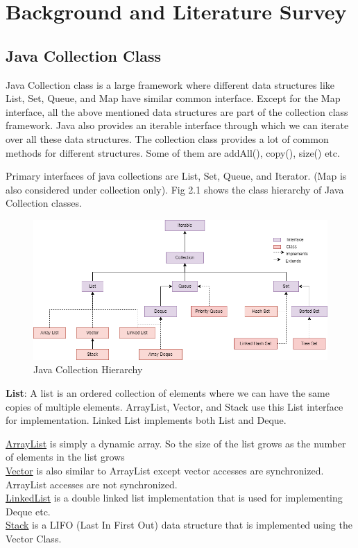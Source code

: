 \chapter{Background and Literature Survey}

\section{Java Collection Class}
Java Collection class is a large framework where different data structures like List, Set, Queue, and Map have similar common interface. Except for the Map interface, all the above mentioned data structures are part of the collection class framework. Java also provides an iterable interface through which we can iterate over all these data structures. The collection class provides a lot of common methods for different structures. Some of them are addAll(), copy(), size() etc.


Primary interfaces of java collections are List, Set, Queue, and Iterator. (Map is also considered under collection only). Fig 2.1 shows the class hierarchy of Java Collection classes.

\begin{figure} [h]
    \centering
    \includegraphics[width = \textwidth]{images/Collections.png}
    \caption{Java Collection Hierarchy}
    \label{fig:my_label}
\end{figure}

\textbf{List}: A list is an ordered collection of elements where we can have the same copies of multiple elements. ArrayList, Vector, and Stack use this List interface for implementation. Linked List implements both List and Deque.

\underline{ArrayList}  is simply a dynamic array. So the size of the list grows as the number of elements in the list grows\\
\underline{Vector} is also similar to ArrayList except vector accesses are synchronized. ArrayList accesses are not synchronized.\\
\underline{LinkedList} is a double linked list implementation that is used for implementing Deque etc.\\
\underline{Stack} is a LIFO (Last In First Out) data structure that is implemented using the Vector Class.
 
